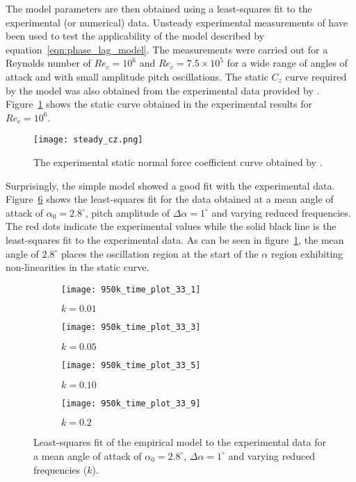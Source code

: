 The model parameters are then obtained using a least-squares fit to the experimental (or numerical) data. Unsteady experimental measurements of \cite{lokattthesis} have been used to test the applicability of the model described by equation~\ref{eqn:phase_lag_model}. The measurements were carried out for a Reynolds number of $Re_{c}=10^{6}$ and $Re_{c}=7.5\times10^{5}$ for a wide range of angles of attack and with small amplitude pitch oscillations. The static $C_{z}$ curve required by the model was also obtained from the experimental data provided by \cite{lokattthesis}. Figure~\ref{fig:cz_static_exp} shows the static curve obtained in the experimental results for $Re_{c}=10^{6}$.
\begin{figure}[h]
	\centering
	\texttt{[image: steady\_cz.png]}
	\caption{The experimental static normal force coefficient curve obtained by \cite{lokattthesis}.}
	\label{fig:cz_static_exp}
\end{figure}
Surprisingly, the simple model showed a good fit with the experimental data. Figure~\ref{fig:model_fits1} shows the least-squares fit for the data obtained at a mean angle of attack of $\alpha_{0}=2.8^{\circ}$, pitch amplitude of $\Delta\alpha=1^{\circ}$ and varying reduced frequencies. The red dots indicate the experimental values while the solid black line is the least-squares fit to the experimental data. As can be seen in figure~\ref{fig:cz_static_exp}, the mean angle of $2.8^{\circ}$ places the oscillation region at the start of the $\alpha$ region exhibiting non-linearities in the static curve.
\begin{figure}[h]
	\centering
	\begin{subfigure}[b]{0.45\textwidth}
		\centering
		\texttt{[image: 950k\_time\_plot\_33\_1]}
		\caption{$k=0.01$}
		\label{fig:k_01}
	\end{subfigure}
	\begin{subfigure}[b]{0.45\textwidth}
		\centering
		\texttt{[image: 950k\_time\_plot\_33\_3]}
		\caption{$k=0.05$}
		\label{fig:k_05}
	\end{subfigure}
	\begin{subfigure}[b]{0.45\textwidth}
		\centering
		\texttt{[image: 950k\_time\_plot\_33\_5]}
		\caption{$k=0.10$}
		\label{fig:k_1}
	\end{subfigure}
	\begin{subfigure}[b]{0.45\textwidth}
		\centering
		\texttt{[image: 950k\_time\_plot\_33\_9]}
		\caption{$k=0.2$}
		\label{fig:k_2}
	\end{subfigure}	
	\caption{Least-squares fit of the empirical model to the experimental data for a mean angle of attack of $\alpha_{0}=2.8^{\circ}$, $\Delta\alpha=1^{\circ}$ and varying reduced frequencies ($k$).}
	\label{fig:model_fits1}
\end{figure}
